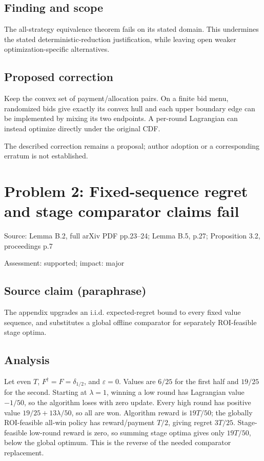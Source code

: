\documentclass[11pt]{article}
\begin{document}
\subsection*{Finding and scope}

The all-strategy equivalence theorem fails on its stated domain. This undermines the stated deterministic-reduction justification, while leaving open weaker optimization-specific alternatives.

\subsection*{Proposed correction}

Keep the convex set of payment/allocation pairs. On a finite bid menu, randomized bids give exactly its convex hull and each upper boundary edge can be implemented by mixing its two endpoints. A per-round Lagrangian can instead optimize directly under the original CDF.

The described correction remains a proposal; author adoption or a corresponding erratum is not established.

\section*{Problem 2: Fixed-sequence regret and stage comparator claims fail}

Source: Lemma B.2, full arXiv PDF pp.23–24; Lemma B.5, p.27; Proposition 3.2, proceedings p.7

Assessment: supported; impact: major

\subsection*{Source claim (paraphrase)}

The appendix upgrades an i.i.d. expected-regret bound to every fixed value sequence, and substitutes a global offline comparator for separately ROI-feasible stage optima.

\subsection*{Analysis}

Let even \(T\), \(F^\dagger=F=\delta_{1/2}\), and \(\varepsilon=0\). Values are \(6/25\) for the first half and \(19/25\) for the second. Starting at \(\lambda=1\), winning a low round has Lagrangian value \(-1/50\), so the algorithm loses with zero update. Every high round has positive value \(19/25+13\lambda/50\), so all are won. Algorithm reward is \(19T/50\); the globally ROI-feasible all-win policy has reward/payment \(T/2\), giving regret \(3T/25\). Stage-feasible low-round reward is zero, so summing stage optima gives only \(19T/50\), below the global optimum. This is the reverse of the needed comparator replacement.
\end{document}
